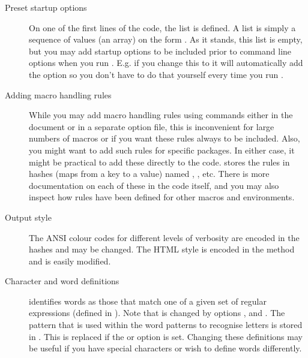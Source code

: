 \documentclass{article}
\begin{document}
\begin{description}

\item[Preset startup options]On one of the first lines of the code, the list  is defined. A list is simply a sequence of values (an array) on the form . As it stands, this list is empty, but you may add startup options to be included prior to command line options when you run \TeXcount{}. E.g. if you change this to  it will automatically add the  option so you don't have to do that yourself every time you run \TeXcount{}.

\item[Adding macro handling rules]While you may add macro handling rules using  commands either in the document or in a separate option file, this is inconvenient for large numbers of macros or if you want these rules always to be included. Also, you might want to add such rules for specific packages. In either case, it might be practical to add these directly to the \TeXcount{} code. \TeXcount{} stores the rules in hashes (maps from a key to a value) named , , etc. There is more documentation on each of these in the code itself, and you may also inspect how rules have been defined for other macros and environments.

\item[Output style]The ANSI colour codes for different levels of verbosity are encoded in the  hashes and may be changed. The HTML style is encoded in the method  and is easily modified. 

\item[Character and word definitions]\TeXcount{} identifies words as those that match one of a given set of regular expressions (defined in ). Note that  is changed by options ,  and  . The pattern that is used within the word patterns to recognise letters is stored in . This is replaced if the  or  option is set. Changing these definitions may be useful if you have special characters or wish to define words differently.

\end{description}


\end{document}
